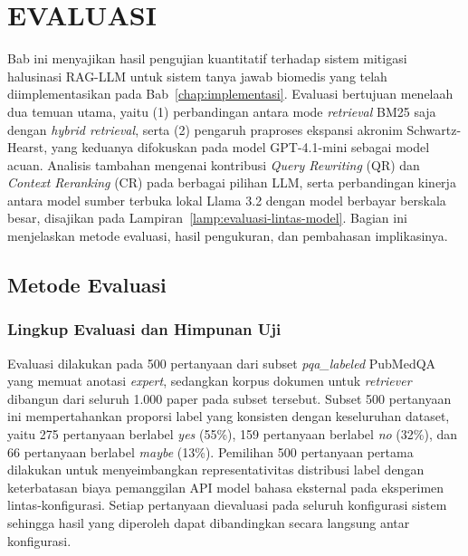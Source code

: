 
\cleardoublepage
\chapter{EVALUASI}
\label{chap:evaluasi}

Bab ini menyajikan hasil pengujian kuantitatif terhadap sistem mitigasi halusinasi RAG-LLM untuk sistem tanya jawab biomedis yang telah diimplementasikan pada Bab~\ref{chap:implementasi}. Evaluasi bertujuan menelaah dua temuan utama, yaitu (1) perbandingan antara mode \textit{retrieval} BM25 saja dengan \textit{hybrid retrieval}, serta (2) pengaruh praproses ekspansi akronim Schwartz-Hearst, yang keduanya difokuskan pada model GPT-4.1-mini sebagai model acuan. Analisis tambahan mengenai kontribusi \textit{Query Rewriting} (QR) dan \textit{Context Reranking} (CR) pada berbagai pilihan LLM, serta perbandingan kinerja antara model sumber terbuka lokal Llama 3.2 dengan model berbayar berskala besar, disajikan pada Lampiran~\ref{lamp:evaluasi-lintas-model}. Bagian ini menjelaskan metode evaluasi, hasil pengukuran, dan pembahasan implikasinya.

\section{Metode Evaluasi}
\label{sec:metode-evaluasi}

\subsection{Lingkup Evaluasi dan Himpunan Uji}
\label{subsec:lingkup-evaluasi}

Evaluasi dilakukan pada 500 pertanyaan dari subset \textit{pqa\_labeled} PubMedQA yang memuat anotasi \textit{expert}, sedangkan korpus dokumen untuk \textit{retriever} dibangun dari seluruh 1.000 paper pada subset tersebut. Subset 500 pertanyaan ini mempertahankan proporsi label yang konsisten dengan keseluruhan dataset, yaitu 275 pertanyaan berlabel \textit{yes} (55\%), 159 pertanyaan berlabel \textit{no} (32\%), dan 66 pertanyaan berlabel \textit{maybe} (13\%). Pemilihan 500 pertanyaan pertama dilakukan untuk menyeimbangkan representativitas distribusi label dengan keterbatasan biaya pemanggilan API model bahasa eksternal pada eksperimen lintas-konfigurasi. Setiap pertanyaan dievaluasi pada seluruh konfigurasi sistem sehingga hasil yang diperoleh dapat dibandingkan secara langsung antar konfigurasi.

